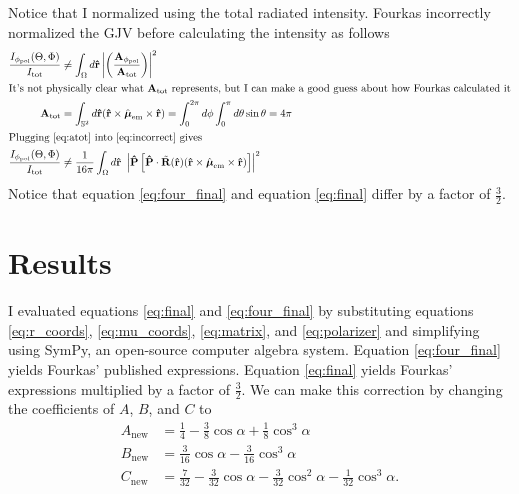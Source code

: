 \documentclass[11pt]{article}
\providecommand{\mb}[1]{\mathbf{#1}}
\providecommand{\mh}[1]{\mathbf{\hat{#1}}}
\providecommand{\bs}[1]{\boldsymbol{#1}}
\begin{document}
Notice that I normalized using the total radiated intensity. Fourkas incorrectly normalized the GJV before calculating the intensity as follows 
\begin{align}
  \frac{I_{\phi_{\text{pol}}}(\Theta, \Phi)}{I_{\text{tot}}} &\neq \int_{\Omega}d\mh{r}\left|\left(\frac{\mb{A}_{\phi_{\text{pol}}}}{\mb{A}_{\text{tot}}}\right)\right|^2\label{eq:incorrect}\\
  \intertext{It's not physically clear what $\mb{A}_{\text{tot}}$ represents, but I can make a good guess about how Fourkas calculated it}
  \mb{A}_{\text{tot}} &= \int_{\mathbb{S}^2} d\mh{r} (\mh{r}\times\hat{\bs{\mu}}_{\text{em}}\times\mh{r}) = \int_0^{2\pi}d\phi\int_0^{\pi}d\theta\sin\theta = 4\pi\label{eq:atot}\\
  \intertext{Plugging \ref{eq:atot} into \ref{eq:incorrect} gives}
  \frac{I_{\phi_{\text{pol}}}(\Theta, \Phi)}{I_{\text{tot}}} &\neq \frac{1}{16\pi}\int_{\Omega}d\mh{r}\ \left|\mh{P}\left[\mh{P}\cdot\tilde{\mb{R}}(\mh{r})(\mh{r}\times\hat{\bs{\mu}}_{\text{em}}\times\mh{r})\right]\right|^2\label{eq:four_final}
\end{align}
Notice that equation \ref{eq:four_final} and equation \ref{eq:final} differ by a factor of $\frac{3}{2}$.

\section{Results}
I evaluated equations \ref{eq:final} and \ref{eq:four_final} by substituting equations \ref{eq:r_coords}, \ref{eq:mu_coords}, \ref{eq:matrix}, and \ref{eq:polarizer} and simplifying using SymPy, an open-source computer algebra system. Equation \ref{eq:four_final} yields Fourkas' published expressions. Equation \ref{eq:final} yields Fourkas' expressions multiplied by a factor of $\frac{3}{2}$. We can make this correction by changing the
coefficients of $A$, $B$, and $C$ to 
\begin{subequations}
\begin{align}
  A_{\text{new}} &= \frac{1}{4} - \frac{3}{8} \cos{\alpha } + \frac{1}{8} \cos^{3}{\alpha }\\
  B_{\text{new}} &= \frac{3}{16} \cos{\alpha } - \frac{3}{16} \cos^{3}{\alpha }\\
  C_{\text{new}} &= \frac{7}{32} - \frac{3}{32} \cos{\alpha } - \frac{3}{32} \cos^{2}{\alpha } - \frac{1}{32} \cos^{3}{\alpha}.
\end{align}\label{eq:coeff2}
\end{subequations}
\end{document}
